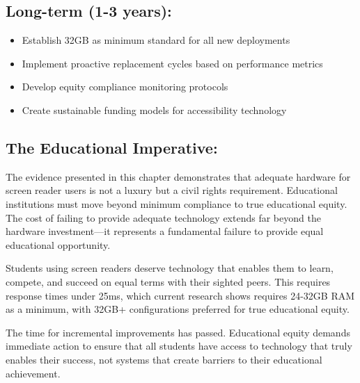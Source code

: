 \subsection{Long-term (1-3 years):}
\begin{itemize}
\item Establish 32GB as minimum standard for all new deployments
\item Implement proactive replacement cycles based on performance metrics
\item Develop equity compliance monitoring protocols
\item Create sustainable funding models for accessibility technology
\end{itemize}

\subsection{The Educational Imperative:}
The evidence presented in this chapter demonstrates that adequate hardware for screen reader users is not a luxury but a civil rights requirement. Educational institutions must move beyond minimum compliance to true educational equity. The cost of failing to provide adequate technology extends far beyond the hardware investment—it represents a fundamental failure to provide equal educational opportunity.

Students using screen readers deserve technology that enables them to learn, compete, and succeed on equal terms with their sighted peers. This requires response times under 25ms, which current research shows requires 24-32GB RAM as a minimum, with 32GB+ configurations preferred for true educational equity.

The time for incremental improvements has passed. Educational equity demands immediate action to ensure that all students have access to technology that truly enables their success, not systems that create barriers to their educational achievement.

